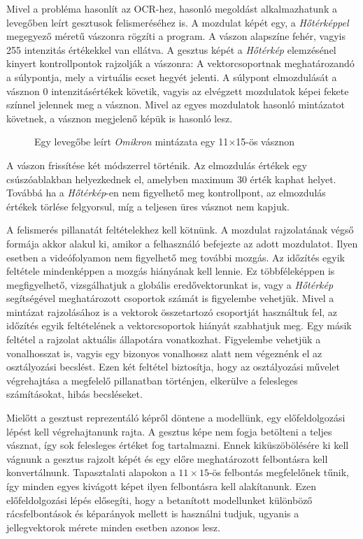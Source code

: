 Mivel a probléma hasonlít az OCR-hez, hasonló megoldást alkalmazhatunk a levegőben leírt gesztusok felismeréséhez is. A mozdulat képét egy, a \textit{Hőtérképpel} megegyező méretű vászonra rögzíti a program. A vászon alapszíne fehér, vagyis 255 intenzitás értékekkel van ellátva. A gesztus képét a \textit{Hőtérkép} elemzésénel kinyert kontrollpontok rajzolják a vászonra: A vektorcsoportnak meghatározandó a súlypontja, mely a virtuális ecset hegyét jelenti. A súlypont elmozdulását a vásznon 0 intenzitásértékek követik, vagyis az elvégzett mozdulatok képei fekete színnel jelennek meg a vásznon. Mivel az egyes mozdulatok hasonló mintázatot követnek, a vásznon megjelenő képük is hasonló lesz.

\begin{figure}[h]
\centering
{}
\caption{Egy levegőbe leírt \textit{Omikron} mintázata egy 11$\times$15-ös vásznon}
\label{fig:ocr-gesture}
\end{figure}

A vászon frissítése két módszerrel történik. Az elmozdulás értékek egy csúszóablakban helyezkednek el, amelyben maximum  30 érték kaphat helyet. Továbbá ha a \textit{Hőtérkép}-en nem figyelhető meg kontrollpont, az elmozdulás értékek törlése felgyorsul, míg a teljesen üres vásznot nem kapjuk.

A felismerés pillanatát feltételekhez kell kötnünk. A mozdulat rajzolatának végső formája akkor alakul ki, amikor a felhasználó befejezte az adott mozdulatot. Ilyen esetben a videófolyamon nem figyelhető meg további mozgás. Az időzítés egyik feltétele mindenképpen a mozgás hiányának kell lennie. Ez többféleképpen is megfigyelhető, vizsgálhatjuk a globális eredővektorunkat is, vagy a \textit{Hőtérkép} segítségével meghatározott csoportok számát is figyelembe vehetjük. Mivel a mintázat rajzolásához is a vektorok összetartozó csoportját használtuk fel, az időzítés egyik feltételének a vektorcsoportok hiányát szabhatjuk meg. Egy másik feltétel a rajzolat aktuális állapotára vonatkozhat. Figyelembe vehetjük a vonalhosszat is, vagyis egy bizonyos vonalhossz alatt nem végeznénk el az osztályozási becslést. Ezen két feltétel biztosítja, hogy az osztályozási művelet végrehajtása a megfelelő pillanatban történjen, elkerülve a felesleges számításokat, hibás becsléseket.

Mielőtt a gesztust reprezentáló képről döntene a modellünk, egy előfeldolgozási lépést kell végrehajtanunk rajta. A gesztus képe nem fogja betölteni a teljes vásznat, így sok felesleges értéket fog tartalmazni. Ennek kiküszöbölésére ki kell vágnunk a gesztus rajzolt képét és egy előre meghatározott felbontásra kell konvertálnunk. Tapasztalati alapokon a $11\times 15$-ös felbontás megfelelőnek tűnik, így minden egyes kivágott képet ilyen felbontásra kell alakítanunk. Ezen előfeldolgozási lépés elősegíti, hogy a betanított modellunket különböző rácsfelbontások és képarányok mellett is használni tudjuk, ugyanis a jellegvektorok mérete minden esetben azonos lesz.

